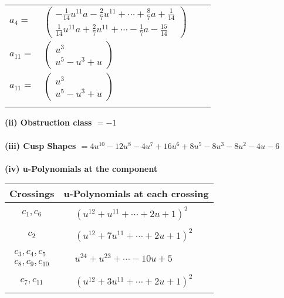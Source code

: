 \documentclass[1p]{elsarticle_modified}
\theoremstyle{definition}
\begin{document}
\begin{tabular}{m{7pt} m{180pt} m{7pt} m{180pt} }
\flushright $a_{4}=$&$\begin{pmatrix}-\frac{1}{14} u^{11} a-\frac{2}{7} u^{11}+\cdots+\frac{8}{7} a+\frac{1}{14}\\\frac{1}{14} u^{11} a+\frac{2}{7} u^{11}+\cdots-\frac{1}{7} a-\frac{15}{14}\end{pmatrix}$ \\
\flushright $a_{11}=$&$\begin{pmatrix}u^3\\u^5- u^3+u\end{pmatrix}$\\ \flushright $a_{11}=$&$\begin{pmatrix}u^3\\u^5- u^3+u\end{pmatrix}$\\&\end{tabular}
\flushleft \textbf{(ii) Obstruction class $= -1$}\\~\\
\flushleft \textbf{(iii) Cusp Shapes $= 4 u^{10}-12 u^8-4 u^7+16 u^6+8 u^5-8 u^3-8 u^2-4 u-6$}\\~\\
\newpage\renewcommand{\arraystretch}{1}
\flushleft \textbf{(iv) u-Polynomials at the component}\newline \\
\begin{tabular}{m{50pt}|m{274pt}}
Crossings & \hspace{64pt}u-Polynomials at each crossing \\
\hline $$\begin{aligned}c_{1},c_{6}\end{aligned}$$&$\begin{aligned}
&(u^{12}+u^{11}+\cdots+2 u+1)^{2}
\end{aligned}$\\
\hline $$\begin{aligned}c_{2}\end{aligned}$$&$\begin{aligned}
&(u^{12}+7 u^{11}+\cdots+2 u+1)^{2}
\end{aligned}$\\
\hline $$\begin{aligned}c_{3},c_{4},c_{5}\\c_{8},c_{9},c_{10}\end{aligned}$$&$\begin{aligned}
&u^{24}+u^{23}+\cdots-10 u+5
\end{aligned}$\\
\hline $$\begin{aligned}c_{7},c_{11}\end{aligned}$$&$\begin{aligned}
&(u^{12}+3 u^{11}+\cdots+2 u+1)^{2}
\end{aligned}$\\
\hline
\end{tabular}\\~\\
\end{document}
